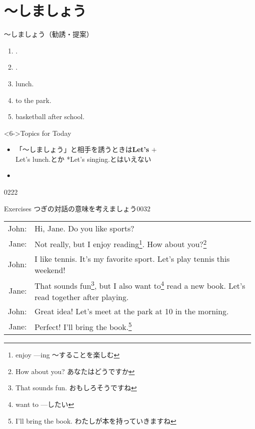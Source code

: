 \documentclass[aspectratio=169,xcolor={dvipsnames,table}]{beamer}
\begin{document}
\section{～しましょう}
\begin{frame}[plain]{～しましょう（勧誘・提案）}
 \begin{enumerate}
  \item<1->  .
  \item<2->  .
  \item<3->   lunch. 
  \item<4->   to the park.
  \item<5->   basketball after school.
 \end{enumerate}

\begin{block}<6->{Topics for Today}
\begin{itemize}[square]\small
 \item 「～しましょう」と相手を誘うときは\textbf{Let's} $+$ \\
\hfill{\scriptsize *Let's lunch.とか\,\,*Let's singing.とはいえない}
 \item {}
 \end{itemize}
     \end{block}

\hfill{\tiny 0222}\,{\scriptsize {}}
\end{frame}
\begin{frame}[plain]{Exercises}
つぎの対話の意味を考えましょう\hfill{\tiny 0032}\,{\scriptsize {}}


\begin{tabular}{rp{}}
John:& Hi, Jane. Do you like sports?\\
Jane:& Not really, but I enjoy reading\footnote{enjoy ---ing ～することを楽しむ}. How about you?\footnote{How about you? あなたはどうですか}\\
John:& I like tennis. It's my favorite sport. Let's play tennis this weekend!\\
Jane:& That sounds fun\footnote{That sounds fun. おもしろそうですね}, but I also want to\footnote{want to ---したい} read a new book. Let's read together after playing.\\
John:& Great idea! Let's meet at the park at 10 in the morning.\\
Jane:& Perfect! I'll bring the book.\footnote{I'll bring the book. わたしが本を持っていきますね}
\end{tabular}
\end{frame}
\end{document}
